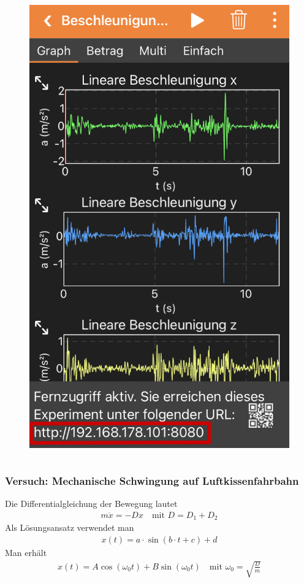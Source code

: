\documentclass{beamer}
\begin{document}
\begin{frame}
\begin{columns}
\begin{figure}[htpb]
            \includegraphics[width=1\textwidth]{fernzugriff3}
        \end{figure}
    \end{columns}

\end{frame}

\begin{frame}
    \frametitle{Versuch: Mechanische Schwingung auf Luftkissenfahrbahn}
    Die Differentialgleichung der Bewegung lautet
    \begin{align*}
        m\ddot{x} = -Dx \quad \text{mit $D=D_1+D_2$}
    \end{align*}
    Als Lösungsansatz verwendet man
    \begin{align*}
        x(t)=a \cdot \sin(b \cdot t +c) +d
    \end{align*}
    Man erhält
    \begin{align*}
        x(t)=A \cos (\omega_0 t) + B \sin(\omega_0 t) \quad \text{mit $\omega_0=\sqrt{\frac{D}{m}}$}
    \end{align*}
\end{frame}
\end{document}

